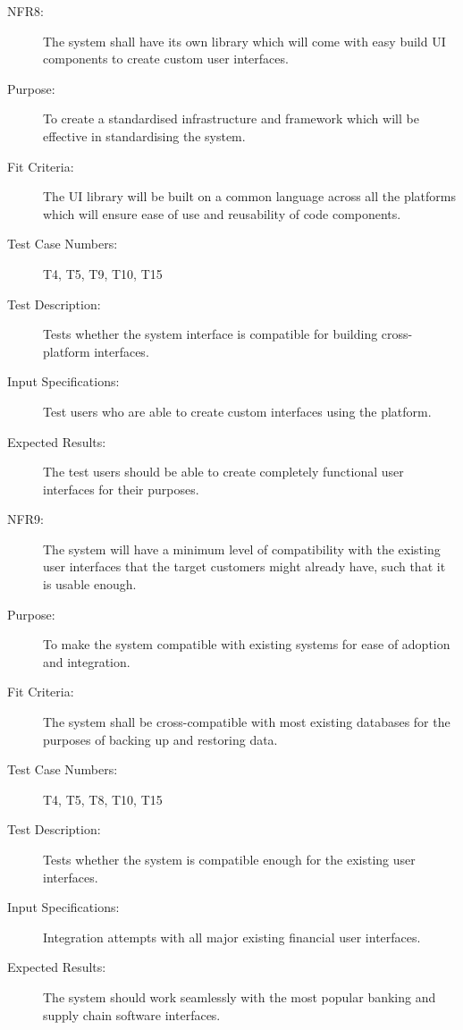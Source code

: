\documentclass[a4paper,twoside,phd]{BYUPhys}
\begin{document}
\begin{description}
\item[NFR8:] The system shall have its own library which will come with easy build UI components to create custom user interfaces.
\item[Purpose:] To create a standardised infrastructure and framework which will be effective in standardising the system.
\item[Fit Criteria:] The UI library will be built on a common language across all the platforms which will ensure ease of use and reusability of code components.
\item[Test Case Numbers:] T4, T5, T9, T10, T15
\item[Test Description:] Tests whether the system interface is compatible for building cross-platform interfaces.
\item[Input Specifications:] Test users who are able to create custom interfaces using the platform. 
\item[Expected Results:] The test users should be able to create completely functional user interfaces for their purposes.

\item[NFR9:] The system will have a minimum level of compatibility with the existing user interfaces that the target customers might already have, such that it is usable enough.
\item[Purpose:] To make the system compatible with existing systems for ease of adoption and integration.
\item[Fit Criteria:] The system shall be cross-compatible with most existing databases for the purposes of backing up and restoring data.
\item[Test Case Numbers:] T4, T5, T8, T10, T15
\item[Test Description:] Tests whether the system is compatible enough for the existing user interfaces.
\item[Input Specifications:] Integration attempts with all major existing financial user interfaces.
\item[Expected Results:] The system should work seamlessly with the most popular banking and supply chain software interfaces.
\end{description}
\end{document}
